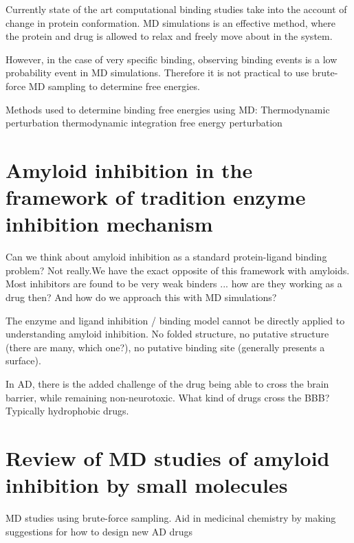 \begin{outline}
	\1 Currently state of the art computational binding studies take into the account of change in protein conformation. MD simulations is an effective method, where the protein and drug is allowed to relax and freely move about in the system.

	\1 However, in the case of very specific binding, observing binding events is a low probability event in MD simulations. Therefore it is not practical to use brute-force MD sampling to determine free energies.

	  \2 Methods used to determine binding free energies using MD:
	  	\3 Thermodynamic perturbation \cite{Gilson:2007hz}
			\4 thermodynamic integration
			\4 free energy perturbation
\end{outline}

\section{Amyloid inhibition in the framework of tradition enzyme inhibition mechanism}
\begin{outline}
    \1 Can we think about amyloid inhibition as a standard protein-ligand binding problem? Not really.We have the exact opposite of this framework with amyloids. Most inhibitors are found to be very weak binders ... how are they working as a drug then? And how do we approach this with MD simulations?

    \1 The enzyme and ligand inhibition / binding model cannot be directly applied to understanding amyloid inhibition.  No folded structure, no putative structure (there are many, which one?), no putative binding site (generally presents a surface).

    \1 In AD, there is the added challenge of the drug being able to cross the brain barrier, while remaining non-neurotoxic.  What kind of drugs cross the BBB?  Typically hydrophobic drugs.
\end{outline}    

\section{Review of MD studies of amyloid inhibition by small molecules}
MD studies using brute-force sampling. Aid in medicinal chemistry by making suggestions for how to design new AD drugs

